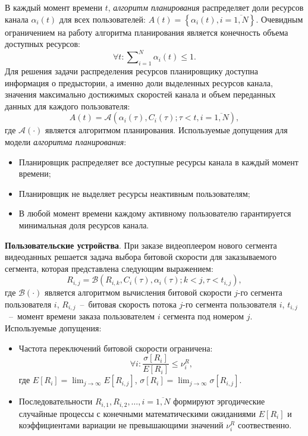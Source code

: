 В каждый момент времени $t$, \textit{алгоритм планирования} распределяет доли ресурсов канала $\alpha_i(t)$ для всех пользователей:  $A(t) = \left\{\alpha_{i}(t), i = \overline{1,N}\right\}$. Очевидным ограничением на работу алгоритма планирования является конечность объема доступных ресурсов:
$$\forall t: \sum\nolimits_{i=1}^{N}\alpha_{i}(t) \leq 1.$$
Для решения задачи распределения ресурсов планировщику доступна информация о предыстории, а именно доли выделенных ресурсов канала, значения максимально достижимых скоростей канала и объем переданных данных для каждого пользователя:
\begin{equation}
\nonumber
A(t) = \mathcal{A}\left( \alpha_i(\tau), C_i(\tau);\tau<t, i=\overline{1,N} \right),
\label{eq:SchedulingRule}
\end{equation}
где $\mathcal{A}\left(\cdot\right)$ является алгоритмом планирования.
\newline
Используемые допущения для модели \textit{алгоритма планирования}:
\begin{itemize}
	\item Планировщик распределяет все доступные ресурсы канала в каждый момент времени;
	\item Планировщик не выделяет ресурсы неактивным пользователям;
	\item В любой момент времени каждому активному пользователю гарантируется минимальная доля ресурсов канала.
\end{itemize}

\textbf{Пользовательские устройства}. При заказе видеоплеером нового сегмента видеоданных решается задача выбора битовой скорости для заказываемого сегмента, которая представлена следующим выражением:
\begin{equation}
\nonumber
R_{i,j} = \mathcal{B}\left(R_{i,k}, C_i(\tau), \alpha_i(\tau); k < j, \tau<t_{i,j} \right),
\end{equation}
где $\mathcal{B}\left(\cdot\right)$ является алгоритмом вычисления битовой скорости $j$-го сегмента пользователя $i$, $R_{i,j}$~--~битовая скорость потока $j$-го сегмента пользователя $i$, $t_{i,j}$~--~момент времени заказа пользователем $i$ сегмента под номером $j$.
\newline
Используемые допущения:
\begin{itemize}
	\item Частота переключений битовой скорости ограничена:
	\begin{equation}
	\nonumber
	\forall i: \frac{ \sigma\left[R_{i}\right] }{ E\left[R_{i}\right]} \leq \nu^R_i,
	\label{eq:SwitchRatio}
	\end{equation}
	где $E[R_i] = \lim\nolimits_{j \rightarrow \infty}E[R_{i,j}]$, $\sigma\left[R_{i}\right] = \lim\nolimits_{j \rightarrow \infty}\sigma\left[R_{i,j}\right]$.
	\item Последовательности $R_{i,1}, R_{i,2}, \ldots, i=\overline{1,N}$ формируют эргодические случайные процессы с конечными математическими ожиданиями $E[R_{i}]$ и коэффициентами вариации не превышающими значений $\nu^R_i$ соотвественно.
\end{itemize}

